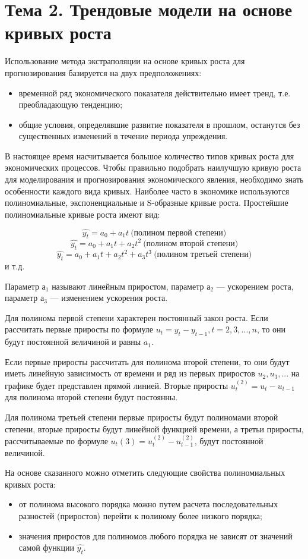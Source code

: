 \section{Тема 2. Трендовые модели на основе кривых роста}

Использование метода экстраполяции на основе кривых роста для прогнозирования базируется на двух предположениях:
\begin{itemize}
	\item временной ряд экономического показателя действительно имеет тренд, т.е. преобладающую тенденцию;
	\item общие условия, определявшие развитие показателя в прошлом, останутся без существенных изменений в течение периода упреждения.
\end{itemize}

В настоящее время насчитывается большое количество типов кривых роста для экономических процессов. Чтобы правильно подобрать наилучшую кривую роста для моделирования и прогнозирования экономического явления, необходимо знать особенности каждого вида кривых. Наиболее часто в экономике используются полиномиальные, экспоненциальные и S-образные кривые роста. Простейшие полиномиальные кривые роста имеют вид:

\[ \hat{y_t} = a_0 + a_1t \ \text{(полином первой степени)}\]
\[ \hat{y_t} = a_0 + a_1t +a_2t^2 \ \text{(полином второй степени)}\]
\[ \hat{y_t} = a_0 + a_1t +a_2t^2 + a_3t^3 \ \text{(полином третьей степени)}\]
и т.д.

Параметр $а_1$ называют линейным приростом, параметр $а_2$ --- ускорением роста, параметр $а_3$ --- изменением ускорения роста.

Для полинома первой степени характерен постоянный закон роста. Если рассчитать первые приросты по формуле $u_t = y_t - y_{t-1}, t = 2, 3, ..., n$, то они будут постоянной величиной и равны $a_1$.

Если первые приросты рассчитать для полинома второй степени, то они будут иметь линейную зависимость от времени и ряд из первых приростов $u_2, u_3, ...$ на графике будет представлен прямой линией. Вторые приросты $u_t^{(2)} = u_t - u_{t-1}$ для полинома второй степени будут постоянны.

Для полинома третьей степени первые приросты будут полиномами второй степени, вторые приросты будут линейной функцией времени, а третьи приросты, рассчитываемые по формуле $u_t{(3)} = u_t^{(2)} - u_{t-1}^{(2)}$, будут постоянной величиной.

На основе сказанного можно отметить следующие свойства полиномиальных кривых роста:
\begin{itemize}
	\item от полинома высокого порядка можно путем расчета последовательных разностей (приростов) перейти к полиному более низкого порядка;
	\item значения приростов для полиномов любого порядка не зависят от значений самой функции $\hat{y_t}$.
\end{itemize}


